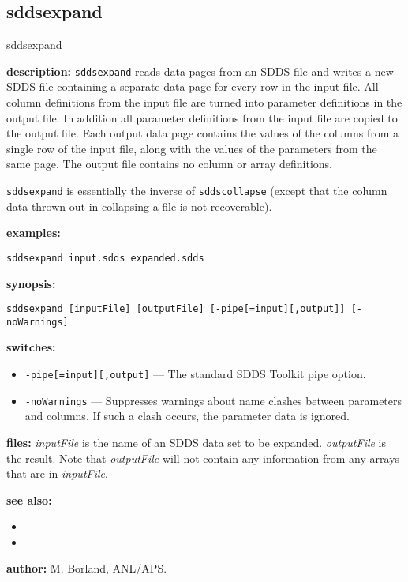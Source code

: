 \newpage
\subsection{sddsexpand}
\label{sddsexpand}

\begin{sddsprog}{sddsexpand}
  \item \textbf{description:} \verb|sddsexpand| reads data pages from an SDDS file and writes a new SDDS file containing a separate data page for every row in the input file. All column definitions from the input file are turned into parameter definitions in the output file. In addition all parameter definitions from the input file are copied to the output file. Each output data page contains the values of the columns from a single row of the input file, along with the values of the parameters from the same page. The output file contains no column or array definitions.

  \verb|sddsexpand| is essentially the inverse of \verb|sddscollapse| (except that the column data thrown out in collapsing a file is not recoverable).
  \item \textbf{examples:}
    \begin{verbatim}
sddsexpand input.sdds expanded.sdds
    \end{verbatim}
  \item \textbf{synopsis:}
    \begin{verbatim}
sddsexpand [inputFile] [outputFile] [-pipe[=input][,output]] [-noWarnings]
    \end{verbatim}
  \item \textbf{switches:}
    \begin{itemize}
      \item \verb|-pipe[=input][,output]| --- The standard SDDS Toolkit pipe option.
      \item \verb|-noWarnings| --- Suppresses warnings about name clashes between parameters and columns. If such a clash occurs, the parameter data is ignored.
    \end{itemize}
  \item \textbf{files:} \emph{inputFile} is the name of an SDDS data set to be expanded. \emph{outputFile} is the result. Note that \emph{outputFile} will not contain any information from any arrays that are in \emph{inputFile}.
  \item \textbf{see also:}
    \begin{itemize}
      \item {}
      \item {}
    \end{itemize}
  \item \textbf{author:} M. Borland, ANL/APS.
\end{sddsprog}
